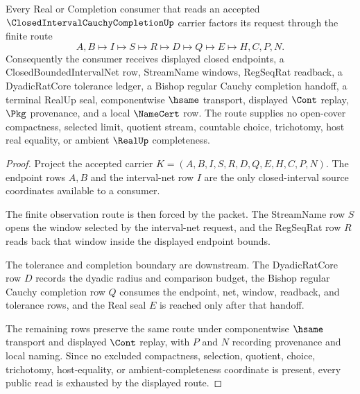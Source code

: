 \begin{theorem}
\label{thm:closed-interval-cauchy-completion-route}
Every Real or Completion consumer that reads an accepted $\ClosedIntervalCauchyCompletionUp$ carrier factors its request through the finite route
$$
A,B \longmapsto I \longmapsto S \longmapsto R \longmapsto D \longmapsto Q \longmapsto E \longmapsto H,C,P,N .
$$
Consequently the consumer receives displayed closed endpoints, a ClosedBoundedIntervalNet row, StreamName windows, RegSeqRat readback, a DyadicRatCore tolerance ledger, a Bishop regular Cauchy completion handoff, a terminal RealUp seal, componentwise $\hsame$ transport, displayed $\Cont$ replay, $\Pkg$ provenance, and a local $\NameCert$ row. The route supplies no open-cover compactness, selected limit, quotient stream, countable choice, trichotomy, host real equality, or ambient $\RealUp$ completeness.
\end{theorem}
\begin{proof}
Project the accepted carrier $K=(A,B,I,S,R,D,Q,E,H,C,P,N)$. The endpoint rows $A,B$ and the interval-net row $I$ are the only closed-interval source coordinates available to a consumer.

The finite observation route is then forced by the packet. The StreamName row $S$ opens the window selected by the interval-net request, and the RegSeqRat row $R$ reads back that window inside the displayed endpoint bounds.

The tolerance and completion boundary are downstream. The DyadicRatCore row $D$ records the dyadic radius and comparison budget, the Bishop regular Cauchy completion row $Q$ consumes the endpoint, net, window, readback, and tolerance rows, and the Real seal $E$ is reached only after that handoff.

The remaining rows preserve the same route under componentwise $\hsame$ transport and displayed $\Cont$ replay, with $P$ and $N$ recording provenance and local naming. Since no excluded compactness, selection, quotient, choice, trichotomy, host-equality, or ambient-completeness coordinate is present, every public read is exhausted by the displayed route.
\end{proof}

